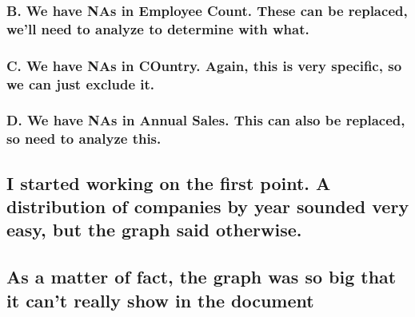 \documentclass[]{article}
\begin{document}
\hypertarget{b.-we-have-nas-in-employee-count.-these-can-be-replaced-well-need-to-analyze-to-determine-with-what.}{%
\subsubsection{B. We have NAs in Employee Count. These can be replaced,
we'll need to analyze to determine with
what.}\label{b.-we-have-nas-in-employee-count.-these-can-be-replaced-well-need-to-analyze-to-determine-with-what.}}

\hypertarget{c.-we-have-nas-in-country.-again-this-is-very-specific-so-we-can-just-exclude-it.}{%
\subsubsection{C. We have NAs in COuntry. Again, this is very specific,
so we can just exclude
it.}\label{c.-we-have-nas-in-country.-again-this-is-very-specific-so-we-can-just-exclude-it.}}

\hypertarget{d.-we-have-nas-in-annual-sales.-this-can-also-be-replaced-so-need-to-analyze-this.}{%
\subsubsection{D. We have NAs in Annual Sales. This can also be
replaced, so need to analyze
this.}\label{d.-we-have-nas-in-annual-sales.-this-can-also-be-replaced-so-need-to-analyze-this.}}

\hypertarget{i-started-working-on-the-first-point.-a-distribution-of-companies-by-year-sounded-very-easy-but-the-graph-said-otherwise.}{%
\subsection{I started working on the first point. A distribution of
companies by year sounded very easy, but the graph said
otherwise.}\label{i-started-working-on-the-first-point.-a-distribution-of-companies-by-year-sounded-very-easy-but-the-graph-said-otherwise.}}

\hypertarget{as-a-matter-of-fact-the-graph-was-so-big-that-it-cant-really-show-in-the-document}{%
\subsection{As a matter of fact, the graph was so big that it can't
really show in the
document}\label{as-a-matter-of-fact-the-graph-was-so-big-that-it-cant-really-show-in-the-document}}
\end{document}
